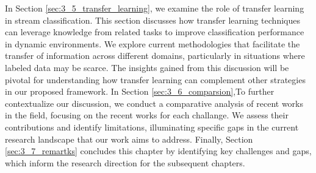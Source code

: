 In Section \ref{sec:3_5_transfer_learning}, we examine the role of transfer learning in stream classification. This section discusses how transfer learning techniques can leverage knowledge from related tasks to improve classification performance in dynamic environments. We explore current methodologies that facilitate the transfer of information across different domains, particularly in situations where labeled data may be scarce. The insights gained from this discussion will be pivotal for understanding how transfer learning can complement other strategies in our proposed framework.
In Section \ref{sec:3_6_comparsion},To further contextualize our discussion, we conduct a comparative analysis of recent works in the field, focusing on the recent works for each challange. We assess their contributions and identify limitations, illuminating specific gaps in the current research landscape that our work aims to address.
Finally, Section \ref{sec:3_7_remartks} concludes this chapter by identifying key challenges and gaps, which inform the research direction for the subsequent chapters.


